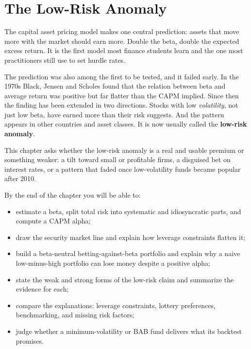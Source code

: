 \makeatletter
{}
\makeatother

\chapter{The Low-Risk Anomaly}
\label{ch:12}

The capital asset pricing model makes one central prediction: assets that move more with the market should earn more. Double the beta, double the expected excess return. It is the first model most finance students learn and the one most practitioners still use to set hurdle rates.

The prediction was also among the first to be tested, and it failed early. In the 1970s Black, Jensen and Scholes found that the relation between beta and average return was positive but far flatter than the CAPM implied. Since then the finding has been extended in two directions. Stocks with low \emph{volatility}, not just low beta, have earned more than their risk suggests. And the pattern appears in other countries and asset classes. It is now usually called the \textbf{low-risk anomaly}.

This chapter asks whether the low-risk anomaly is a real and usable premium or something weaker: a tilt toward small or profitable firms, a disguised bet on interest rates, or a pattern that faded once low-volatility funds became popular after 2010.

By the end of the chapter you will be able to:

\begin{itemize}
  \item estimate a beta, split total risk into systematic and idiosyncratic parts, and compute a CAPM alpha;
  \item draw the security market line and explain how leverage constraints flatten it;
  \item build a beta-neutral betting-against-beta portfolio and explain why a naive low-minus-high portfolio can lose money despite a positive alpha;
  \item state the weak and strong forms of the low-risk claim and summarize the evidence for each;
  \item compare the explanations: leverage constraints, lottery preferences, benchmarking, and missing risk factors;
  \item judge whether a minimum-volatility or BAB fund delivers what its backtest promises.
\end{itemize}

